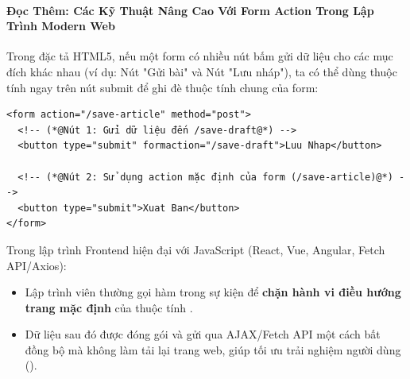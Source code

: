 \paragraph{Đọc Thêm: Các Kỹ Thuật Nâng Cao Với Form Action Trong Lập Trình Modern Web}

\begin{conceptBox}
Trong đặc tả HTML5, nếu một form có nhiều nút bấm gửi dữ liệu cho các mục đích khác nhau (ví dụ: Nút "Gửi bài" và Nút "Lưu nháp"), ta có thể dùng thuộc tính  ngay trên nút submit để ghi đè thuộc tính  chung của form:
\begin{codeWindow}
\begin{lstlisting}[language=HTML5]
<form action="/save-article" method="post">
  <!-- (*@Nút 1: Gửi dữ liệu đến /save-draft@*) -->
  <button type="submit" formaction="/save-draft">Luu Nhap</button>
  
  <!-- (*@Nút 2: Sử dụng action mặc định của form (/save-article)@*) -->
  <button type="submit">Xuat Ban</button>
</form>
\end{lstlisting}
\end{codeWindow}
\end{conceptBox}

\begin{tipBox}
Trong lập trình Frontend hiện đại với JavaScript (React, Vue, Angular, Fetch API/Axios):
\begin{itemize}[leftmargin=1.5em, itemsep=2pt, parsep=0pt]
    \item Lập trình viên thường gọi hàm  trong sự kiện  để \textbf{chặn hành vi điều hướng trang mặc định} của thuộc tính .
    \item Dữ liệu sau đó được đóng gói và gửi qua AJAX/Fetch API một cách bất đồng bộ mà không làm tải lại trang web, giúp tối ưu trải nghiệm người dùng ().
\end{itemize}
\end{tipBox}

